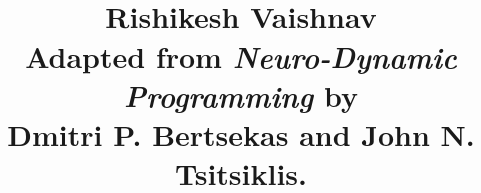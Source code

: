 \title{
\\
\vspace{10pt}
\large 
Rishikesh Vaishnav\\ 
\vspace{10pt}
\normalsize 
Adapted from
{\it Neuro-Dynamic Programming}
by \\
Dmitri P. Bertsekas
and
John N. Tsitsiklis.
}
\maketitle
{}
